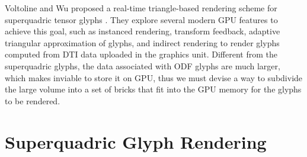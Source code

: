 \documentclass[twoside,twocolumn,10pt]{article}
\begin{document}


\label{ssec:superquadric_rendering}

Voltoline and Wu \cite{voltoline2021} proposed a real-time triangle-based rendering scheme for superquadric tensor glyphs \cite{Kindlmann2004}. They explore several modern GPU features to achieve this goal, such as instanced rendering, transform feedback, adaptive triangular approximation of glyphs, and indirect rendering to render glyphs computed from DTI data uploaded in the graphics unit. Different from the superquadric glyphs, the data associated with ODF glyphs are much larger, which makes inviable to store it on GPU, thus we must devise a way to subdivide the large volume into a set of bricks that fit into the GPU memory for the glyphs to be rendered.






\section{Superquadric Glyph Rendering}

\end{document}

